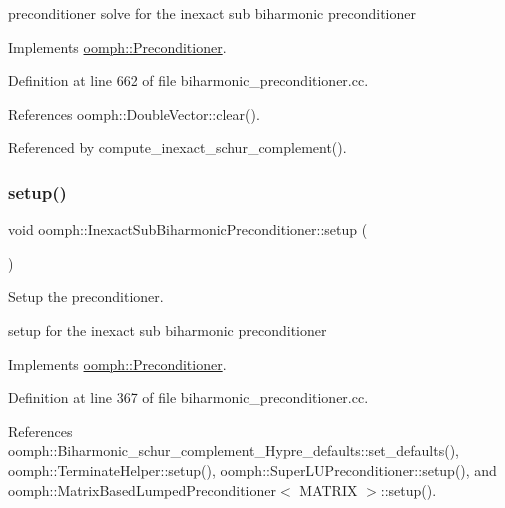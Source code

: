 preconditioner solve for the inexact sub biharmonic preconditioner 

Implements \hyperlink{classoomph_1_1Preconditioner_ace1199369e4465cd2b9a34884bb64ec8}{oomph\+::\+Preconditioner}.



Definition at line 662 of file biharmonic\+\_\+preconditioner.\+cc.



References oomph\+::\+Double\+Vector\+::clear().



Referenced by compute\+\_\+inexact\+\_\+schur\+\_\+complement().

\mbox{\label{classoomph_1_1InexactSubBiharmonicPreconditioner_aedc32eecdba45ee74777d340665ebdee}} 
\subsubsection{\texorpdfstring{setup()}{setup()}}
{\footnotesize\ttfamily void oomph\+::\+Inexact\+Sub\+Biharmonic\+Preconditioner\+::setup (\begin{DoxyParamCaption}{ }\end{DoxyParamCaption})\hspace{0.3cm}{\ttfamily [virtual]}}



Setup the preconditioner. 

setup for the inexact sub biharmonic preconditioner 

Implements \hyperlink{classoomph_1_1Preconditioner_af4886f4efe510e5c9b0eb19422943588}{oomph\+::\+Preconditioner}.



Definition at line 367 of file biharmonic\+\_\+preconditioner.\+cc.



References oomph\+::\+Biharmonic\+\_\+schur\+\_\+complement\+\_\+\+Hypre\+\_\+defaults\+::set\+\_\+defaults(), oomph\+::\+Terminate\+Helper\+::setup(), oomph\+::\+Super\+L\+U\+Preconditioner\+::setup(), and oomph\+::\+Matrix\+Based\+Lumped\+Preconditioner$<$ M\+A\+T\+R\+I\+X $>$\+::setup().



